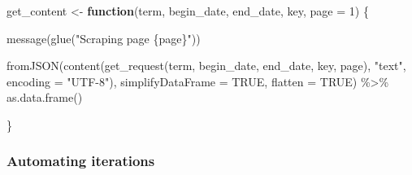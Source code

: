 \documentclass[
]{book}
\newenvironment{Shaded}{\begin{snugshade}}{\end{snugshade}}
\newcommand{\AttributeTok}[1]{\textcolor[rgb]{0.77,0.63,0.00}{#1}}
\newcommand{\ConstantTok}[1]{\textcolor[rgb]{0.00,0.00,0.00}{#1}}
\newcommand{\ControlFlowTok}[1]{\textcolor[rgb]{0.13,0.29,0.53}{\textbf{#1}}}
\newcommand{\DecValTok}[1]{\textcolor[rgb]{0.00,0.00,0.81}{#1}}
\newcommand{\FunctionTok}[1]{\textcolor[rgb]{0.00,0.00,0.00}{#1}}
\newcommand{\NormalTok}[1]{#1}
\newcommand{\OtherTok}[1]{\textcolor[rgb]{0.56,0.35,0.01}{#1}}
\newcommand{\SpecialCharTok}[1]{\textcolor[rgb]{0.00,0.00,0.00}{#1}}
\newcommand{\StringTok}[1]{\textcolor[rgb]{0.31,0.60,0.02}{#1}}
\begin{document}
\begin{Shaded}
\begin{Highlighting}[]
\NormalTok{get\_content }\OtherTok{\textless{}{-}} \ControlFlowTok{function}\NormalTok{(term, begin\_date, end\_date, key, }\AttributeTok{page =} \DecValTok{1}\NormalTok{) \{}

    \FunctionTok{message}\NormalTok{(}\FunctionTok{glue}\NormalTok{(}\StringTok{"Scraping page \{page\}"}\NormalTok{))}

    \FunctionTok{fromJSON}\NormalTok{(}\FunctionTok{content}\NormalTok{(}\FunctionTok{get\_request}\NormalTok{(term, begin\_date, end\_date, key, page),}
                     \StringTok{"text"}\NormalTok{,}
                \AttributeTok{encoding =} \StringTok{"UTF{-}8"}\NormalTok{),}
                \AttributeTok{simplifyDataFrame =} \ConstantTok{TRUE}\NormalTok{, }\AttributeTok{flatten =} \ConstantTok{TRUE}\NormalTok{) }\SpecialCharTok{\%\textgreater{}\%} \FunctionTok{as.data.frame}\NormalTok{()}

\NormalTok{\}}
\end{Highlighting}
\end{Shaded}

\hypertarget{automating-iterations}{%
\subsubsection{Automating iterations}\label{automating-iterations}}
\end{document}

